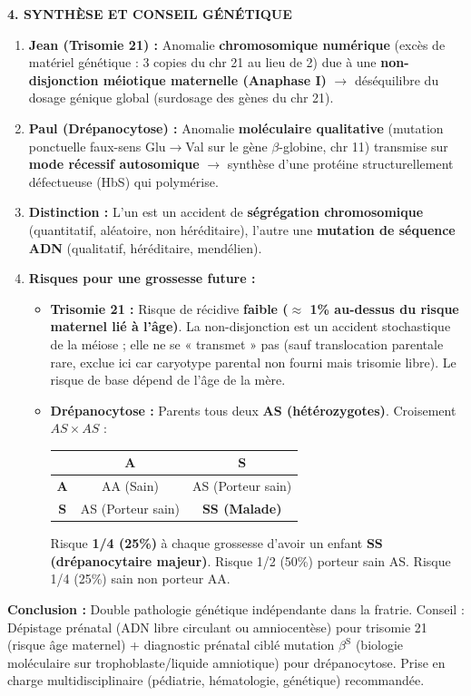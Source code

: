 \documentclass[11pt]{article}
\begin{document}
\begin{exoresolu}
\textbf{4. SYNTHÈSE ET CONSEIL GÉNÉTIQUE}
\begin{enumerate}
\item \textbf{Jean (Trisomie 21) :} Anomalie \textbf{chromosomique numérique} (excès de matériel génétique : 3 copies du chr 21 au lieu de 2) due à une \textbf{non-disjonction méiotique maternelle (Anaphase I)} $\to$ déséquilibre du dosage génique global (surdosage des gènes du chr 21).
\item \textbf{Paul (Drépanocytose) :} Anomalie \textbf{moléculaire qualitative} (mutation ponctuelle faux-sens Glu$\to$Val sur le gène $\beta$-globine, chr 11) transmise sur \textbf{mode récessif autosomique} $\to$ synthèse d'une protéine structurellement défectueuse (HbS) qui polymérise.
\item \textbf{Distinction :} L'un est un accident de \textbf{ségrégation chromosomique} (quantitatif, aléatoire, non héréditaire), l'autre une \textbf{mutation de séquence ADN} (qualitatif, héréditaire, mendélien).
\item \textbf{Risques pour une grossesse future :}
\begin{itemize}
\item \textbf{Trisomie 21 :} Risque de récidive \textbf{faible ($\approx$ 1\% au-dessus du risque maternel lié à l'âge)}. La non-disjonction est un accident stochastique de la méiose ; elle ne se « transmet » pas (sauf translocation parentale rare, exclue ici car caryotype parental non fourni mais trisomie libre). Le risque de base dépend de l'âge de la mère.
\item \textbf{Drépanocytose :} Parents tous deux \textbf{AS (hétérozygotes)}. Croisement $AS \times AS$ :
\begin{center}
\begin{tabular}{|c|c|c|}\hline
 & \textbf{A} & \textbf{S} \\ \hline
\textbf{A} & AA (Sain) & AS (Porteur sain) \\ \hline
\textbf{S} & AS (Porteur sain) & \textbf{SS (Malade)} \\ \hline
\end{tabular}
\end{center}
Risque \textbf{1/4 (25\%)} à chaque grossesse d'avoir un enfant \textbf{SS (drépanocytaire majeur)}. Risque 1/2 (50\%) porteur sain AS. Risque 1/4 (25\%) sain non porteur AA.
\end{itemize}
\end{enumerate}
\textbf{Conclusion :} Double pathologie génétique indépendante dans la fratrie. Conseil : Dépistage prénatal (ADN libre circulant ou amniocentèse) pour trisomie 21 (risque âge maternel) + diagnostic prénatal ciblé mutation $\beta^{\text{S}}$ (biologie moléculaire sur trophoblaste/liquide amniotique) pour drépanocytose. Prise en charge multidisciplinaire (pédiatrie, hématologie, génétique) recommandée.

\end{exoresolu}
\end{document}
